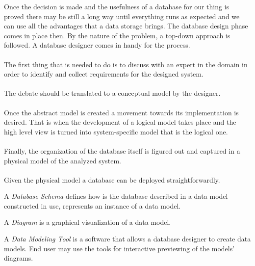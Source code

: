 \par
Once the decision is made and the usefulness of a database for our thing is proved there may be still a long way until everything runs as expected and we can use all the advantages that a data storage brings.
The database design phase comes in place then. By the nature of the problem, a top-down approach is followed.
A database designer comes in handy for the process. \\ \\
The first thing that is needed to do is to discuss with an expert in the domain  in order to identify and collect requirements for the designed system. \\ \\
The debate should be translated to a conceptual model by the designer.  \\ \\
Once the abstract model is created a movement towards its implementation is desired. That is when the development of a logical model takes place and the high level view is turned into system-specific model that is the logical one. \\ \\
Finally, the organization of the database itself is figured out and captured in a physical model of the analyzed system. \\ \\
Given the physical model a database can be deployed straightforwardly. \\

\par 
A \textit{Database Schema} defines how is the database described in a data model constructed in use, represents an instance of a data model. \\
\par 
A \textit{Diagram} is a graphical visualization of a data model. \\
\par
A \textit{Data Modeling Tool} is a software that allows a database designer to create data models. End user may use the tools for interactive previewing of the models' diagrams. \\

\par
{} \\

